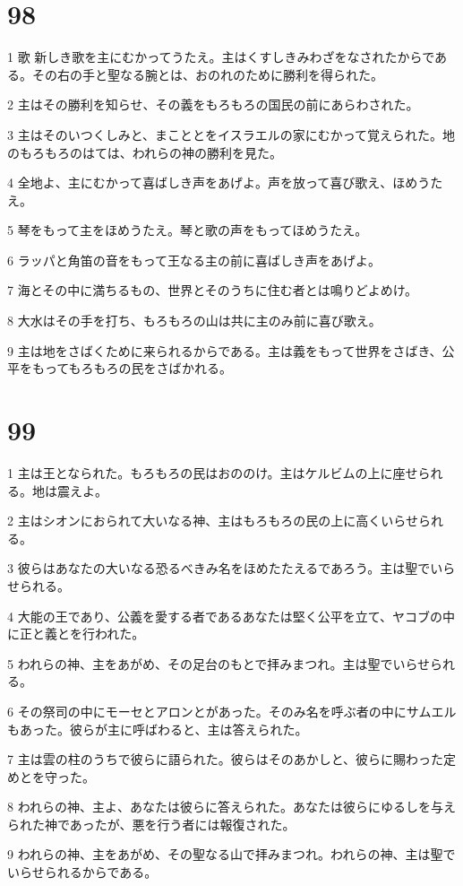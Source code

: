 \chapter{98}

\par 1 歌 新しき歌を主にむかってうたえ。主はくすしきみわざをなされたからである。その右の手と聖なる腕とは、おのれのために勝利を得られた。
\par 2 主はその勝利を知らせ、その義をもろもろの国民の前にあらわされた。
\par 3 主はそのいつくしみと、まこととをイスラエルの家にむかって覚えられた。地のもろもろのはては、われらの神の勝利を見た。
\par 4 全地よ、主にむかって喜ばしき声をあげよ。声を放って喜び歌え、ほめうたえ。
\par 5 琴をもって主をほめうたえ。琴と歌の声をもってほめうたえ。
\par 6 ラッパと角笛の音をもって王なる主の前に喜ばしき声をあげよ。
\par 7 海とその中に満ちるもの、世界とそのうちに住む者とは鳴りどよめけ。
\par 8 大水はその手を打ち、もろもろの山は共に主のみ前に喜び歌え。
\par 9 主は地をさばくために来られるからである。主は義をもって世界をさばき、公平をもってもろもろの民をさばかれる。

\chapter{99}

\par 1 主は王となられた。もろもろの民はおののけ。主はケルビムの上に座せられる。地は震えよ。
\par 2 主はシオンにおられて大いなる神、主はもろもろの民の上に高くいらせられる。
\par 3 彼らはあなたの大いなる恐るべきみ名をほめたたえるであろう。主は聖でいらせられる。
\par 4 大能の王であり、公義を愛する者であるあなたは堅く公平を立て、ヤコブの中に正と義とを行われた。
\par 5 われらの神、主をあがめ、その足台のもとで拝みまつれ。主は聖でいらせられる。
\par 6 その祭司の中にモーセとアロンとがあった。そのみ名を呼ぶ者の中にサムエルもあった。彼らが主に呼ばわると、主は答えられた。
\par 7 主は雲の柱のうちで彼らに語られた。彼らはそのあかしと、彼らに賜わった定めとを守った。
\par 8 われらの神、主よ、あなたは彼らに答えられた。あなたは彼らにゆるしを与えられた神であったが、悪を行う者には報復された。
\par 9 われらの神、主をあがめ、その聖なる山で拝みまつれ。われらの神、主は聖でいらせられるからである。

